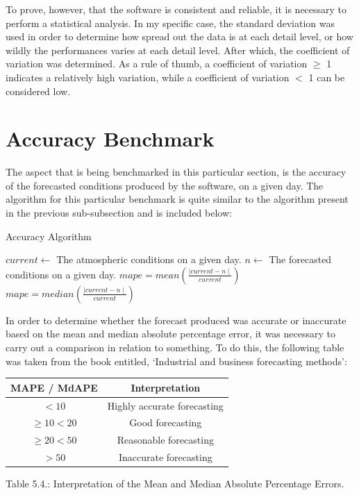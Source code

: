 To prove, however, that the software is consistent and reliable, it is necessary to perform a statistical analysis. In my specific case, the standard deviation was used in order to determine how spread out the data is at each detail level, or how wildly the performances varies at each detail level. After which, the coefficient of variation was determined. As a rule of thumb, a coefficient of variation $\geq$ 1 indicates a relatively high variation, while a coefficient of variation $<$ 1 can be considered low.

\section{Accuracy Benchmark}
The aspect that is being benchmarked in this particular section, is the accuracy of the forecasted conditions produced by the software, on a given day. The algorithm for this particular benchmark is quite similar to the algorithm present in the previous sub-subsection and is included below:

\begin{algorithm}[H]
    \caption{Accuracy Algorithm}
    \begin{algorithmic}[1]
        \State $ current \gets $ The atmospheric conditions on a given day. 
        \State $ n \gets $ The forecasted conditions on a given day.
            \State $mape = mean(\frac{\mid current - n \mid}{current})$
            \State $mape = median(\frac{\mid current - n \mid}{current})$
        \EndFunction
    \end{algorithmic}
\end{algorithm}

In order to determine whether the forecast produced was accurate or inaccurate based on the mean and median absolute percentage error, it was necessary to carry out a comparison in relation to something. To do this, the following table was taken from the book entitled, `Industrial and business forecasting methods'\cite{mape}:

\hfill

\begin{center}
    \begin{tabular}{|c|c|} 
     \hline
     MAPE / MdAPE & Interpretation \\
     \hline
     $<10$  & Highly accurate forecasting \\
     \hline
     $\geq 10<20 $ & Good forecasting \\
     \hline
     $\geq 20<50 $ & Reasonable forecasting \\
     \hline
     $>50$ & Inaccurate forecasting \\
     \hline
    \end{tabular}\par
    \bigskip
    Table 5.4.: Interpretation of the Mean and Median Absolute Percentage Errors.
\end{center}

